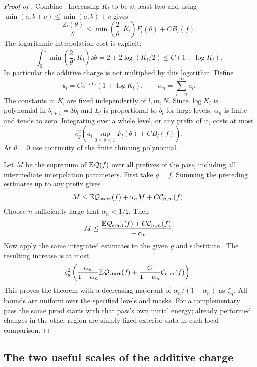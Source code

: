 \begin{proof}[Proof of ]
Combine .  Increasing $K_l$ to be
at least two and using $\min(a,b+c)\le\min(a,b)+c$ gives
\[
 \frac{Z_l(\theta)}{\theta}
       \le \min\left(\frac2\theta,K_l\right)F_l(\theta)
                                                +C B_l(f).
\]
The logarithmic interpolation cost is explicit:
\[
 \int_0^1\min\left(\frac2\theta,K_l\right)\dd\theta
                   =2+2\log(K_l/2)
                   \le C(1+\log K_l).
\]
In particular the additive charge is not multiplied by this logarithm.
Define
\[
 a_l=C e^{-cL_l}(1+\log K_l),\qquad
                    \alpha_n=\sum_{l=n}^{\infty}a_l.
\]
The constants in $K_l$ are fixed independently of $l,m,N$.  Since
$\log K_l$ is polynomial in $b_{l+1}=3b_l$ and $L_l$ is proportional
to $b_l$ for large levels, $\alpha_n$ is finite and tends to zero.
Integrating  over a whole level, or any prefix
of it, costs at most
\[
 c_g^2\left(a_l\sup_{0\le\theta\le1}F_l(\theta)
                                             +C B_l(f)\right).
\]
At $\theta=0$ use continuity of the finite thinning polynomial.

Let $M$ be the supremum of $\mathbb E\mathcal Q(f)$ over all prefixes of the
pass, including all intermediate interpolation parameters.  First take
$g=f$.  Summing the preceding estimates up to any prefix gives
\[
 M\le\mathbb E\mathcal Q_{\rm start}(f)
                         +\alpha_n M+C\mathcal C_{n,m}(f).
\]
Choose $n$ sufficiently large that $\alpha_n<1/2$.  Then
\begin{equation}
 M\le\frac{\mathbb E\mathcal Q_{\rm start}(f)
                        +C\mathcal C_{n,m}(f)}{1-\alpha_n}.
 \label{hier:prefix-supremum}
\end{equation}
Now apply the same integrated estimates to the given $g$ and substitute
.  The resulting increase is at most
\[
 c_g^2\left(
       \frac{\alpha_n}{1-\alpha_n}\mathbb E\mathcal Q_{\rm start}(f)
              +\frac{C}{1-\alpha_n}\mathcal C_{n,m}(f)\right).
\]
This proves the theorem with a decreasing majorant of
$\alpha_n/(1-\alpha_n)$ as $\zeta_n$.  All bounds are uniform over
the specified levels and masks.  For a complementary pass the same
proof starts with that pass's own initial energy; already performed
changes in the other region are simply fixed exterior data in each
local comparison.
\end{proof}

\subsection{The two useful scales of the additive charge}

